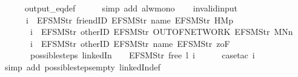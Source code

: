 \begin{isabellebody}
\ \ \ \ \isamarkupfalse%
\ output_eq{\isacharunderscore}def\isanewline
\ \ \ \ \isamarkupfalse%
\ {\isacharparenleft}simp\ add{\isacharcolon}\ alw{\isacharunderscore}mono{\isacharparenright}\isanewline
\ \ \isamarkupfalse%
\isanewline
{}\isamarkupfalse%
%
\endisatagproof
{\isafoldproof}%
%
\isadelimproof
\isanewline
%
\endisadelimproof
\isanewline
{}\isamarkupfalse%
\ invalid{\isacharunderscore}input{\isacharunderscore}{}{\isacharcolon}\isanewline
\ \ \ \ \ \ {\isachardoublequoteopen}i\ {\isasymnoteq}\ {\isacharbrackleft}EFSM{\isachardot}Str\ {\isacharprime}{\isacharprime}friendID{\isacharprime}{\isacharprime}{\isacharcomma}\ EFSM{\isachardot}Str\ {\isacharprime}{\isacharprime}name{\isacharprime}{\isacharprime}{\isacharcomma}\ EFSM{\isachardot}Str\ {\isacharprime}{\isacharprime}HM{}p{\isacharprime}{\isacharprime}{\isacharbrackright}\ {\isasymLongrightarrow}\isanewline
\ \ \ \ \ \ \ i\ {\isasymnoteq}\ {\isacharbrackleft}EFSM{\isachardot}Str\ {\isacharprime}{\isacharprime}otherID{\isacharprime}{\isacharprime}{\isacharcomma}\ EFSM{\isachardot}Str\ {\isacharprime}{\isacharprime}OUT{\isacharunderscore}OF{\isacharunderscore}NETWORK{\isacharprime}{\isacharprime}{\isacharcomma}\ EFSM{\isachardot}Str\ {\isacharprime}{\isacharprime}MNn{}{\isacharprime}{\isacharprime}{\isacharbrackright}\ {\isasymLongrightarrow}\isanewline
\ \ \ \ \ \ \ i\ {\isasymnoteq}\ {\isacharbrackleft}EFSM{\isachardot}Str\ {\isacharprime}{\isacharprime}otherID{\isacharprime}{\isacharprime}{\isacharcomma}\ EFSM{\isachardot}Str\ {\isacharprime}{\isacharprime}name{\isacharprime}{\isacharprime}{\isacharcomma}\ EFSM{\isachardot}Str\ {\isacharprime}{\isacharprime}{}zoF{\isacharprime}{\isacharprime}{\isacharbrackright}\ {\isasymLongrightarrow}\isanewline
\ \ \ \ \ \ \ possible{\isacharunderscore}steps\ linkedIn\ {}\ {\isacharparenleft}{\isacharless}{\isachargreater}{\isacharparenleft}{}\ {\isacharcolon}{\isacharequal}\ EFSM{\isachardot}Str\ {\isacharprime}{\isacharprime}free{\isacharprime}{\isacharprime}{\isacharparenright}{\isacharparenright}\ l\ i\ {\isacharequal}\ {\isacharbraceleft}{\isacharbar}{\isacharbar}{\isacharbraceright}{\isachardoublequoteclose}\isanewline
%
\isadelimproof
\ \ %
\endisadelimproof
%
\isatagproof
{}\isamarkupfalse%
\ {\isacharparenleft}case{\isacharunderscore}tac\ i{\isacharparenright}\isanewline
\ \ \ \isamarkupfalse%
\ {\isacharparenleft}simp\ add{\isacharcolon}\ possible{\isacharunderscore}steps{\isacharunderscore}empty\ linkedIn{\isacharunderscore}def{\isacharparenright}\isanewline

\end{isabellebody}

